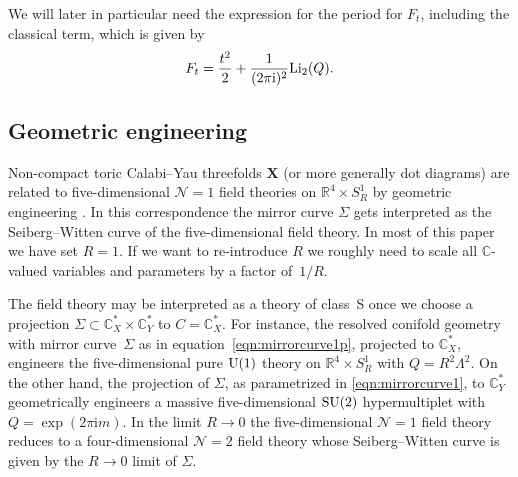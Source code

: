\documentclass[pdftex]{sigma}
\numberwithin{equation}{section}
\begin{document}
We will later in particular need the expression for the period for $F_t$, including the classical term, which is given by
\begin{equation}\label{eq:classicatFt}
 F_t= \frac{t^2}{2}+\frac{1}{(2\pi \mathrm{i})^2} {\rm Li}_2(Q).
\end{equation}

\subsection{Geometric engineering}\label{sec:geomeng}

Non-compact toric Calabi--Yau threefolds $\mathbf{X}$ (or more generally dot diagrams) are related to five-dimensional $\mathcal{N}=1$ field theories on $\mathbb{R}^4 \times S_R^1$ by geometric engineering \cite{Benini:2009gi, KKV}. In this correspondence the mirror curve $\Sigma$ gets interpreted as the Seiberg--Witten curve of the five-dimensional field theory. In most of this paper we have set $R=1$. If we want to re-introduce $R$ we roughly need to scale all $\mathbb{C}$-valued variables and parameters by a factor of~$1/R$.

The field theory may be interpreted as a theory of class~S once we choose a projection
$\Sigma \subset \mathbb{C}_X^* \times \mathbb{C}_Y^*$ to $C = \mathbb{C}_X^*$. For instance, the resolved conifold geometry with mirror curve~$\Sigma$ as in equation~\eqref{eqn:mirrorcurve1p}, projected to $\mathbb{C}^*_X$, engineers the five-dimensional pure ${\rm U}(1)$ theory on $\mathbb{R}^4 \times S_R^1$ with $Q = R^2 \Lambda^2$. On the other hand, the projection of $\Sigma$, as parametrized in \eqref{eqn:mirrorcurve1}, to $\mathbb{C}^*_Y$ geometrically engineers a massive five-dimensional ${\rm SU}(2)$ hypermultiplet with $Q = \exp(2 \pi \mathrm{i} m)$. In the limit $R \to 0$ the five-dimensional $\mathcal{N}=1$ field theory reduces to a four-dimensional $\mathcal{N}=2$ field theory whose Seiberg--Witten curve is given by the $R\to 0$ limit of $\Sigma$.
\end{document}
